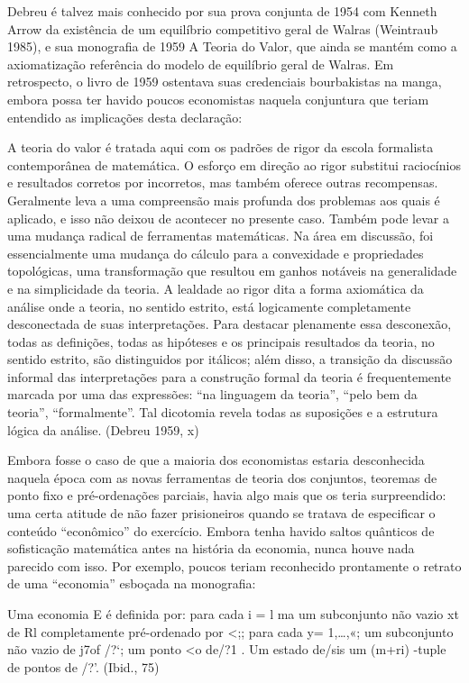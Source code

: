 \documentclass[12pt]{article}
\begin{document}
Debreu é talvez mais conhecido por sua prova conjunta de 1954 com Kenneth Arrow da existência de um equilíbrio competitivo geral de Walras (Weintraub 1985), e sua monografia de 1959 A Teoria do Valor, que ainda se mantém como a axiomatização referência do modelo de equilíbrio geral de Walras. Em retrospecto, o livro de 1959 ostentava suas credenciais bourbakistas na manga, embora possa ter havido poucos economistas naquela conjuntura que teriam entendido as implicações desta declaração:

A teoria do valor é tratada aqui com os padrões de rigor da escola formalista contemporânea de matemática. O esforço em direção ao rigor substitui raciocínios e resultados corretos por incorretos, mas também oferece outras recompensas. Geralmente leva a uma compreensão mais profunda dos problemas aos quais é aplicado, e isso não deixou de acontecer no presente caso. Também pode levar a uma mudança radical de ferramentas matemáticas. Na área em discussão, foi essencialmente uma mudança do cálculo para a convexidade e propriedades topológicas, uma transformação que resultou em ganhos notáveis na generalidade e na simplicidade da teoria. A lealdade ao rigor dita a forma axiomática da análise onde a teoria, no sentido estrito, está logicamente completamente desconectada de suas interpretações. Para destacar plenamente essa desconexão, todas as definições, todas as hipóteses e os principais resultados da teoria, no sentido estrito, são distinguidos por itálicos; além disso, a transição da discussão informal das interpretações para a construção formal da teoria é frequentemente marcada por uma das expressões: “na linguagem da teoria”, “pelo bem da teoria”, “formalmente”. Tal dicotomia revela todas as suposições e a estrutura lógica da análise. (Debreu 1959, x)

Embora fosse o caso de que a maioria dos economistas estaria desconhecida naquela época com as novas ferramentas de teoria dos conjuntos, teoremas de ponto fixo e pré-ordenações parciais, havia algo mais que os teria surpreendido: uma certa atitude de não fazer prisioneiros quando se tratava de especificar o conteúdo “econômico” do exercício. Embora tenha havido saltos quânticos de sofisticação matemática antes na história da economia, nunca houve nada parecido com isso. Por exemplo, poucos teriam reconhecido prontamente o retrato de uma “economia” esboçada na monografia:

Uma economia E é definida por: para cada i = l ma um subconjunto não vazio xt de Rl completamente pré-ordenado por <;; para cada y= 1,…,«; um subconjunto não vazio de j7of /?‘; um ponto <o de/?1 . Um estado de/sis um (m+ri) -tuple de pontos de /?’. (Ibid., 75)
\end{document}
